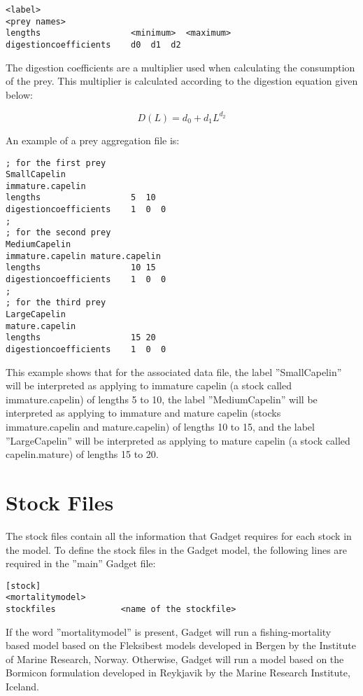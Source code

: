 \documentclass [a4paper, 10pt]{book}
\begin{document}
\begin{verbatim}
<label>
<prey names>
lengths                  <minimum>  <maximum>
digestioncoefficients    d0  d1  d2
\end{verbatim}

The digestion coefficients are a multiplier used when calculating the consumption of the prey.  This multiplier is calculated according to the digestion equation given below:

\begin{equation}\label{eq:digestion}
D(L) = d_{0} + d_{1}L ^{d_{2}}
\end{equation}

\bigskip
An example of a prey aggregation file is:

\begin{verbatim}
; for the first prey
SmallCapelin
immature.capelin
lengths                  5  10
digestioncoefficients    1  0  0
;
; for the second prey
MediumCapelin
immature.capelin mature.capelin
lengths                  10 15
digestioncoefficients    1  0  0
;
; for the third prey
LargeCapelin
mature.capelin
lengths                  15 20
digestioncoefficients    1  0  0
\end{verbatim}

This example shows that for the associated data file, the label ''SmallCapelin'' will be interpreted as applying to immature capelin (a stock called immature.capelin) of lengths 5 to 10, the label ''MediumCapelin'' will be interpreted as applying to immature and mature capelin (stocks immature.capelin and mature.capelin) of lengths 10 to 15, and the label ''LargeCapelin'' will be interpreted as applying to mature capelin (a stock called capelin.mature) of lengths 15 to 20.

\chapter{Stock Files}\label{chap:stock}
The stock files contain all the information that Gadget requires for each stock in the model.  To define the stock files in the Gadget model, the following lines are required in the ''main'' Gadget file:

\begin{verbatim}
[stock]
<mortalitymodel>
stockfiles             <name of the stockfile>
\end{verbatim}

If the word ''mortalitymodel'' is present, Gadget will run a fishing-mortality based model based on the Fleksibest models developed in Bergen by the Institute of Marine Research, Norway.  Otherwise, Gadget will run a model based on the Bormicon formulation developed in Reykjavik by the Marine Research Institute, Iceland.
\end{document}
